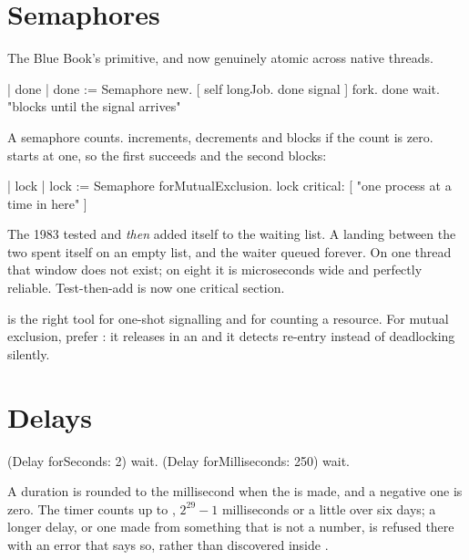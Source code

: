 \section{Semaphores}

The Blue Book's primitive, and now genuinely atomic across native threads.

\begin{st}
| done |
done := Semaphore new.
[ self longJob. done signal ] fork.
done wait.                    "blocks until the signal arrives"
\end{st}

A semaphore counts.  increments,  decrements and blocks if
the count is zero.  starts at one, so the
first  succeeds and the second blocks:

\begin{st}
| lock |
lock := Semaphore forMutualExclusion.
lock critical: [ "one process at a time in here" ]
\end{st}

\begin{stnote}
The 1983  tested  and \emph{then} added itself to
the waiting list. A  landing between the two spent itself on an
empty list, and the waiter queued forever. On one thread that window does not
exist; on eight it is microseconds wide and perfectly reliable. Test-then-add
is now one critical section.
\end{stnote}

 is the right tool for one-shot signalling and for counting a
resource. For mutual exclusion, prefer : it releases in an
 and it detects re-entry instead of deadlocking silently.

\section{Delays}

\begin{st}
(Delay forSeconds: 2) wait.
(Delay forMilliseconds: 250) wait.
\end{st}

A duration is rounded to the millisecond when the  is made, and a
negative one is zero. The timer counts up to ,
$2^{29}-1$ milliseconds or a little over six days; a longer delay, or one
made from something that is not a number, is refused there with an error
that says so, rather than discovered inside .

